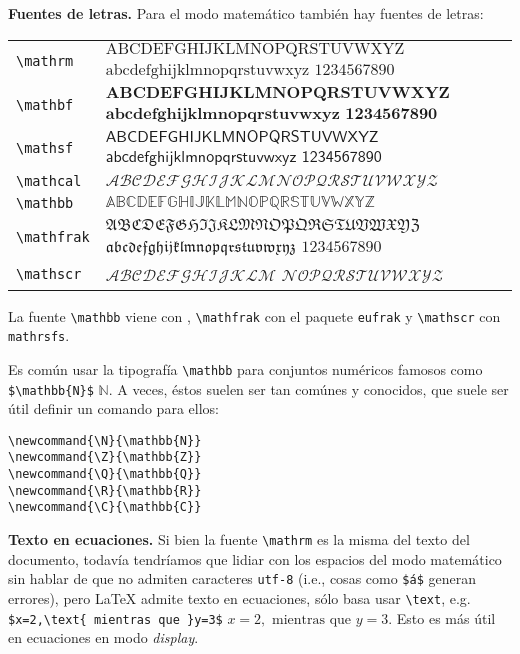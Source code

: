 \documentclass[intro-breve-latex.tex]{subfiles}
\begin{document}
\textbf{Fuentes de letras.} Para el modo matemático también hay fuentes de letras:
\begin{center}
	\begin{longtable}{lp{8cm}}
		\hline \hline
		\endhead
		\hline \hline
		\endfoot

		\lstinline|\mathrm|   & $\mathrm{ABCDEFGHIJKLMNOPQRSTUVWXYZ}$ $\mathrm{abcdefghijklmnopqrstuvwxyz}$ $\mathrm{1234567890}$ \\
		\lstinline|\mathbf|   & $\mathbf{ABCDEFGHIJKLMNOPQRSTUVWXYZ}$ $\mathbf{abcdefghijklmnopqrstuvwxyz}$ $\mathbf{1234567890}$ \\
		\lstinline|\mathsf|   & $\mathsf{ABCDEFGHIJKLMNOPQRSTUVWXYZ}$ $\mathsf{abcdefghijklmnopqrstuvwxyz}$ $\mathsf{1234567890}$ \\
		\lstinline|\mathcal|  & $\mathcal{ABCDEFGHIJKLMNOPQRSTUVWXYZ}$ \\
		\lstinline|\mathbb|   & $\mathbb{ABCDEFGHIJKLMNOPQRSTUVWXYZ}$ \\
		\lstinline|\mathfrak| & $\mathfrak{ABCDEFGHIJKLMNOPQRSTUVWXYZ}$ $\mathfrak{abcdefghijklmnopqrstuvwxyz}$ $\mathfrak{1234567890}$ \\
		\lstinline|\mathscr|  & $\mathscr{ABCDEFGHIJKLM}$ $\mathscr{NOPQRSTUVWXYZ}$ \\
	\end{longtable}
\end{center}
La fuente \lstinline|\mathbb| viene con \AmS{}, \lstinline|\mathfrak| con el paquete \texttt{eufrak} y\break
\lstinline|\mathscr| con \texttt{mathrsfs}.

Es común usar la tipografía \lstinline|\mathbb| para conjuntos numéricos famosos como \lstinline|$\mathbb{N}$| $\mathbb{N}$. A veces,
éstos suelen ser tan comúnes y conocidos, que suele ser útil definir un comando para ellos:
\begin{lstlisting}
\newcommand{\N}{\mathbb{N}}
\newcommand{\Z}{\mathbb{Z}}
\newcommand{\Q}{\mathbb{Q}}
\newcommand{\R}{\mathbb{R}}
\newcommand{\C}{\mathbb{C}}
\end{lstlisting}
\textbf{Texto en ecuaciones.}
Si bien la fuente \lstinline|\mathrm| es la misma del texto del documento, todavía tendríamos que lidiar con los
espacios del modo matemático sin hablar de que no admiten caracteres \texttt{utf-8} (i.e., cosas como \lstinline|$á$|
generan errores), pero \LaTeX{} admite texto en ecuaciones, sólo basa usar \lstinline|\text|, e.g.
\lstinline|$x=2,\text{ mientras que }y=3$| $x=2,\text{ mientras que }y=3$. Esto es más útil en ecuaciones en modo
\textit{display}.
\end{document}
